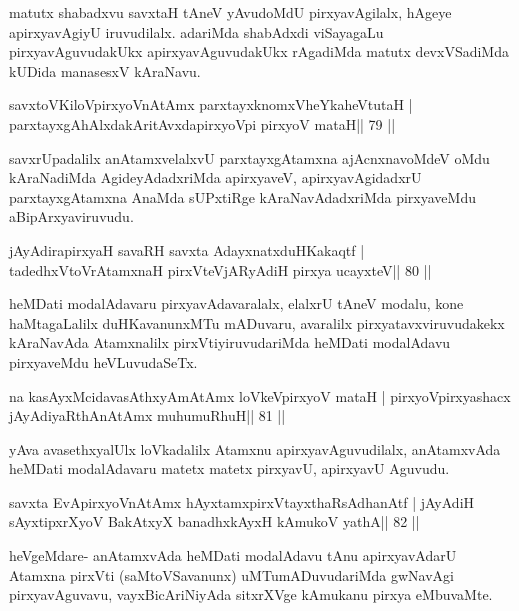 \begin{artha}
matutx shabadxvu savxtaH tAneV yAvudoMdU pirxyavAgilalx, hAgeye apirxyavAgiyU iruvudilalx. adariMda shabAdxdi viSayagaLu pirxyavAguvudakUkx apirxyavAguvudakUkx rAgadiMda matutx devxVSadiMda kUDida manasesxV kAraNavu.
\end{artha}


\begin{shl}
savxtoV\s KiloV\s pirxyoV\s nAtAmx parxtayxknomxVheYkaheVtutaH |
parxtayxgAhAlxdakAritAvxdapirxyoV\s pi pirxyoV mataH\hfill || 79 ||
\end{shl}

\begin{artha}
savxrUpadalilx anAtamxvelalxvU parxtayxgAtamxna ajAcnxnavoMdeV oMdu kAraNadiMda AgideyAdadxriMda apirxyaveV, apirxyavAgidadxrU parxtayxgAtamxna AnaMda sUPxtiRge kAraNavAdadxriMda pirxyaveMdu aBipArxyaviruvudu.
\end{artha}

\begin{shl}
jAyAdirapirxyaH savaRH savxta AdayxnatxduHKakaqtf |
tadedhxVtoVrAtamxnaH pirxVteVjARyAdiH pirxya ucayxteV\hfill || 80 ||
\end{shl}

\begin{artha}
heMDati modalAdavaru pirxyavAdavaralalx, elalxrU tAneV modalu, kone haMtagaLalilx duHKavanunxMTu mADuvaru, avaralilx pirxyatavxviruvudakekx kAraNavAda Atamxnalilx pirxVtiyiruvudariMda heMDati modalAdavu pirxyaveMdu heVLuvudaSeTx.
\end{artha}

\begin{shl}
na kasAyxMcidavasAthxyAmAtAmx loVkeV\s pirxyoV mataH |
pirxyoV\s pirxyashacx jAyAdiyaRthA\s nAtAmx muhumuRhuH\hfill || 81 ||
\end{shl}

\begin{artha}
yAva avasethxyalUlx loVkadalilx Atamxnu apirxyavAguvudilalx, anAtamxvAda heMDati modalAdavaru matetx matetx pirxyavU, apirxyavU Aguvudu.
\end{artha}

\begin{shl}
savxta EvApirxyoV\s nAtAmx hAyxtamxpirxVtayxthaRsAdhanAtf |
jAyAdiH sAyxtipxrXyoV BakAtxyX banadhxkAyxH kAmukoV yathA\hfill || 82 ||
\end{shl}

\begin{artha}
heVgeMdare- anAtamxvAda heMDati modalAdavu tAnu apirxyavAdarU Atamxna pirxVti (saMtoVSavanunx) uMTumADuvudariMda gwNavAgi pirxyavAguvavu, vayxBicAriNiyAda sitxrXVge kAmukanu pirxya eMbuvaMte.
\end{artha}

